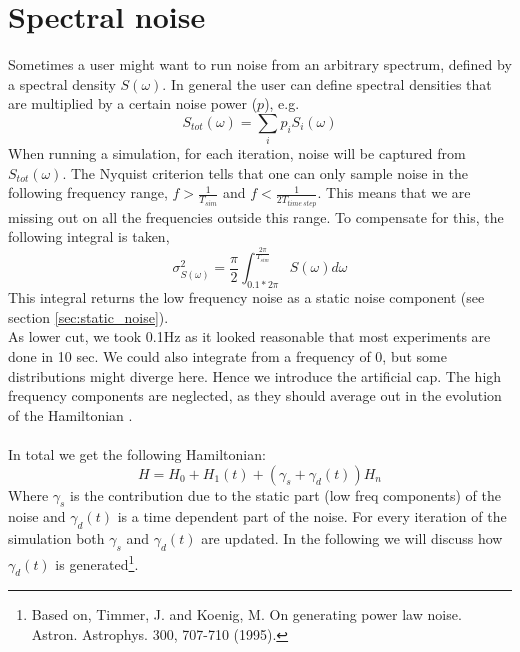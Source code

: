 \documentclass{paper}
\begin{document}
\section{Spectral noise} %
\label{sec:spectral_noise}
Sometimes a user might want to run noise from an arbitrary spectrum, defined by a spectral density $S(\omega)$.
In general the user can define spectral densities that are multiplied by a certain noise power ($p$), e.g.
\begin{equation}
	S_{tot}(\omega) = \sum_i p_i S_i(\omega)
\end{equation}
When running a simulation, for each iteration, noise will be captured from $S_{tot}(\omega)$. The Nyquist criterion tells that one can only sample noise in the following frequency range, $f > \frac{1}{T_{sim}} $ and $f < \frac{1}{2T_{time\:step}}$. This means that we are missing out on all the frequencies outside this range. To compensate for this, the following integral is taken,
\begin{equation}
	\sigma^2_{S(\omega)} = \frac{\pi}{2} \int^{\frac{2\pi}{T_{sim}}}_{0.1*2\pi} S(\omega) d\omega
\end{equation}
This integral returns the low frequency noise as a static noise component (see section \ref{sec:static_noise}).\\As lower cut, we took 0.1Hz as it looked reasonable that most experiments are done in 10 sec. We could also integrate from a frequency of 0, but some distributions might diverge here. Hence we introduce the artificial cap. The high frequency components are neglected, as they should average out in the evolution of the Hamiltonian .
\\
\\
In total we get the following Hamiltonian:
\begin{equation}
	H = H_0 + H_1(t) + (\gamma_s + \gamma_d(t) )H_n
\end{equation}
Where $\gamma_s$ is the contribution due to the static part (low freq components) of the noise and $\gamma_d(t)$ is a time dependent part of the noise. For every iteration of the simulation both $\gamma_s$ and $\gamma_d(t)$ are updated. In the following we will discuss how $\gamma_d(t)$ is generated\footnote{Based on, Timmer, J. and Koenig, M. On generating power law noise. Astron. Astrophys. 300, 707-710 (1995).}.
\end{document}
